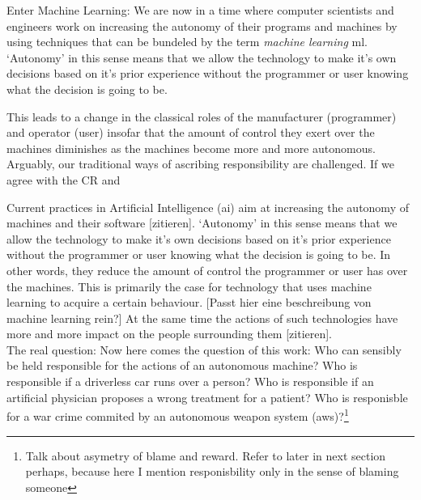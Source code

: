 \documentclass{article}
\begin{document}
Enter Machine Learning:
We are now in a time where computer scientists and engineers work on increasing
the autonomy of their programs and machines by using techniques that can be
bundeled by the term \textit{machine learning} \acrshort{ml}. `Autonomy' in this sense
means that we allow the technology to make it's own decisions based on it's
prior experience without the programmer or user knowing what the decision is
going to be. 


This leads to a change in the classical roles of the manufacturer
(programmer) and operator (user) insofar that the amount of control they exert
over the machines diminishes as the machines become more and more autonomous.
Arguably, our traditional ways of ascribing responsibility are challenged. If we
agree with the CR and 


Current practices in Artificial Intelligence (\acrshort{ai}) aim at increasing
the autonomy of machines and their software [zitieren]. `Autonomy' in this sense
means that we allow the technology to make it's own decisions based on it's
prior experience without the programmer or user knowing what the decision is
going to be. In other words, they reduce the amount of control the programmer or
user has over the machines. This is primarily the case for technology that uses
machine learning to acquire a certain behaviour. [Passt hier eine beschreibung
von machine learning rein?] At the same time the actions of
such technologies have more and more impact on the people surrounding them
[zitieren].\\

The real question:
Now here comes the question of this work: Who can sensibly be held responsible for the
actions of an autonomous machine?
Who is responsible if a driverless car runs over a person? Who is responsible if
an artificial physician proposes a wrong treatment for a patient? Who is
responisble for a war crime commited by an autonomous weapon system
(\acrshort{aws})?\footnote{Talk about asymetry of blame and reward. Refer to
later in next section perhaps, because here I mention responisbility only in the
sense of blaming someone}\\
\end{document}
